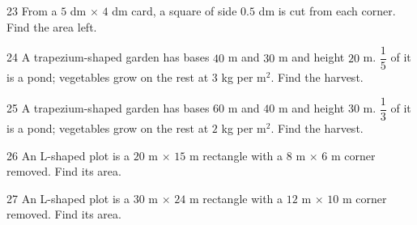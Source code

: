 \gap
\begin{probbox}{23}{\relax}
From a $5$ dm $\times$ $4$ dm card, a square of side $0.5$ dm is cut from each corner. Find the area left.
\end{probbox}
\gap
\begin{probbox}{24}{\relax}
A trapezium-shaped garden has bases $40$ m and $30$ m and height $20$ m. $\dfrac{1}{5}$ of it is a pond; vegetables grow on the rest at $3$ kg per m$^2$. Find the harvest.
\end{probbox}
\gap
\begin{probbox}{25}{\relax}
A trapezium-shaped garden has bases $60$ m and $40$ m and height $30$ m. $\dfrac{1}{3}$ of it is a pond; vegetables grow on the rest at $2$ kg per m$^2$. Find the harvest.
\end{probbox}
\gap
\begin{probbox}{26}{\relax}
An L-shaped plot is a $20$ m $\times$ $15$ m rectangle with a $8$ m $\times$ $6$ m corner removed. Find its area.
\end{probbox}
\gap
\begin{probbox}{27}{\relax}
An L-shaped plot is a $30$ m $\times$ $24$ m rectangle with a $12$ m $\times$ $10$ m corner removed. Find its area.
\end{probbox}
